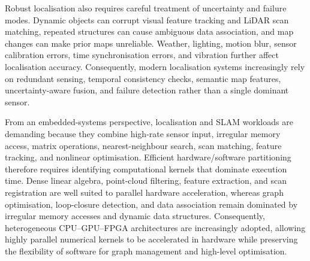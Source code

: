 Robust localisation also requires careful treatment of uncertainty and failure modes. Dynamic objects can corrupt visual feature tracking and LiDAR scan matching, repeated structures can cause ambiguous data association, and map changes can make prior maps unreliable. Weather, lighting, motion blur, sensor calibration errors, time synchronisation errors, and vibration further affect localisation accuracy. Consequently, modern localisation systems increasingly rely on redundant sensing, temporal consistency checks, semantic map features, uncertainty-aware fusion, and failure detection rather than a single dominant sensor.

From an embedded-systems perspective, localisation and SLAM workloads are demanding because they combine high-rate sensor input, irregular memory access, matrix operations, nearest-neighbour search, scan matching, feature tracking, and nonlinear optimisation. Efficient hardware/software partitioning therefore requires identifying computational kernels that dominate execution time. Dense linear algebra, point-cloud filtering, feature extraction, and scan registration are well suited to parallel hardware acceleration, whereas graph optimisation, loop-closure detection, and data association remain dominated by irregular memory accesses and dynamic data structures. Consequently, heterogeneous CPU--GPU--FPGA architectures are increasingly adopted, allowing highly parallel numerical kernels to be accelerated in hardware while preserving the flexibility of software for graph management and high-level optimisation.

